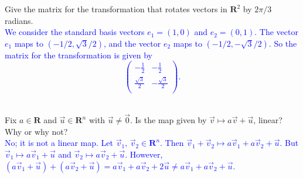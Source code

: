 \documentclass[a4paper,11pt]{article}
\newcommand{\R}{\mathbf{R}}
\newcommand{\BB}[1]{\textcolor{blue}{#1}}
\begin{document}
 Give the matrix for the transformation that
rotates vectors in $\R^2$ by $2\pi/3$ radians. \\

\BB{We consider the standard basis vectors $e_1=(1,0)$ and $e_2=(0,1)$. The
  vector $e_1$ maps to $(-1/2,\sqrt{3}/2)$, and the vector $e_2$ maps to
  $(-1/2,-\sqrt{3}/2)$. So the matrix for the transformation is given by
  \[
    \left(
      \begin{array}{cc}
        -\frac{1}{2} & -\frac{1}{2} \\
        \frac{\sqrt{3}}{2} & -\frac{\sqrt{3}}{2} \\
      \end{array}
    \right).
  \] \\
}

 Fix $a \in \R$ and $\vec u \in \R^n$ with $\vec
u \neq \vec 0$. Is the map given by $\vec v \mapsto a\vec v + \vec u$, linear?
Why or why not? \\

\BB{No; it is not a linear map. Let $\vec v_1,\,\vec v_2 \in \R^n$. Then $\vec
  v_1+\vec v_2 \mapsto a\vec v_1+a\vec v_2+\vec u$. But $\vec v_1 \mapsto a\vec
  v_1+\vec u$ and $\vec v_2 \mapsto a\vec v_2+\vec u$. However, $(a\vec v_1+\vec
  u)+(a\vec v_2+\vec u)=a\vec v_1+a\vec v_2+2\vec u \neq a\vec v_1+a\vec
  v_2+\vec u$. \\}
\end{document}
